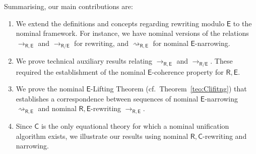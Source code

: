 \documentclass[11pt,a4paper]{amsart}
\newcommand{\caleq}{\approx_{\alpha,\theory{C}}}
\newcommand{\dani}[1]{\textcolor{orange}{#1}}
\newcommand{\theory}[1]{\ensuremath{\mathsf{#1}}}
\theoremstyle{plain}
\theoremstyle{definition}
\theoremstyle{remark}
\begin{document}
Summarising, our main contributions are:
\begin{enumerate}
 \item We extend the definitions and concepts regarding rewriting modulo $\theory{E}$ to the nominal framework. For instance, we have nominal versions of the relations $\to_{\theory{R,E}}$ and $\to_{\theory{R/E}}$ for rewriting, and $\rightsquigarrow_\theory{R,E}$ for nominal \theory{E}-narrowing.
 \item We prove technical auxiliary results relating $\to_{\theory{R,E}}$ and $\to_{\theory{R/E}}$. These required the establishment of the nominal \theory{E}-coherence property for ${\theory{R,E}}$.
 \item We  prove the nominal \theory{E}-Lifting Theorem (cf.\ Theorem~\ref{teo:Clifitng}) that establishes a correspondence between sequences of nominal \theory{E}-narrowing  $\rightsquigarrow_\theory{R,E}$ and nominal \theory{R,E}-rewriting $\to_{\theory{R,E}}$.
 \item Since $\theory{C}$ is the only equational theory for which a nominal unification algorithm exists, we illustrate our results using nominal $\theory{R,C}$-rewriting and narrowing.
   
\end{enumerate}
\end{document}
